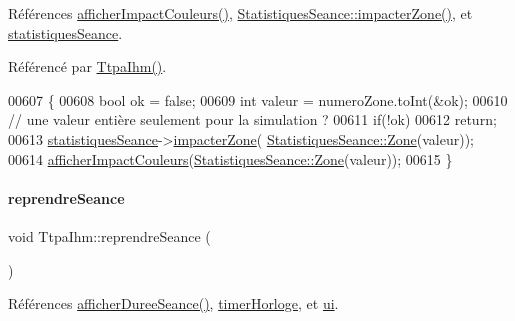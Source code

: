 Références \hyperlink{class_ttpa_ihm_a6e3cd3828ce5d165497e343bdb15cd87}{afficher\+Impact\+Couleurs()}, \hyperlink{class_statistiques_seance_adf93738ca1b6b117ac91b68772d2c4c8}{Statistiques\+Seance\+::impacter\+Zone()}, et \hyperlink{class_ttpa_ihm_abed6897d6f7b4d3a5eb8dcc07651e740}{statistiques\+Seance}.



Référencé par \hyperlink{class_ttpa_ihm_ab3ed4b37a93ff04842414d4a98861d66}{Ttpa\+Ihm()}.


\begin{DoxyCode}
00607 \{
00608     \textcolor{keywordtype}{bool} ok = \textcolor{keyword}{false};
00609     \textcolor{keywordtype}{int} valeur = numeroZone.toInt(&ok);
00610     \textcolor{comment}{// une valeur entière seulement pour la simulation ?}
00611     \textcolor{keywordflow}{if}(!ok)
00612         \textcolor{keywordflow}{return};
00613     \hyperlink{class_ttpa_ihm_abed6897d6f7b4d3a5eb8dcc07651e740}{statistiquesSeance}->\hyperlink{class_statistiques_seance_adf93738ca1b6b117ac91b68772d2c4c8}{impacterZone}(
      \hyperlink{class_statistiques_seance_aa839f5192cbadd7c3fb3651d62eff8b5}{StatistiquesSeance::Zone}(valeur));
00614     \hyperlink{class_ttpa_ihm_a6e3cd3828ce5d165497e343bdb15cd87}{afficherImpactCouleurs}(\hyperlink{class_statistiques_seance_aa839f5192cbadd7c3fb3651d62eff8b5}{StatistiquesSeance::Zone}(valeur));
00615 \}
\end{DoxyCode}
\mbox{\label{class_ttpa_ihm_acf4cf42c5d1481ccda7ae12bace0a6d5}} 
\paragraph{\texorpdfstring{reprendre\+Seance}{reprendreSeance}}
{\footnotesize\ttfamily void Ttpa\+Ihm\+::reprendre\+Seance (\begin{DoxyParamCaption}{ }\end{DoxyParamCaption})\hspace{0.3cm}{\ttfamily [slot]}}



Références \hyperlink{class_ttpa_ihm_a266897eb263e584b40fc2b7c26347623}{afficher\+Duree\+Seance()}, \hyperlink{class_ttpa_ihm_a447ad7262efa01d22bc3222e0e470087}{timer\+Horloge}, et \hyperlink{class_ttpa_ihm_ad5fae1222a667da158c26f3d0f0dce23}{ui}.



